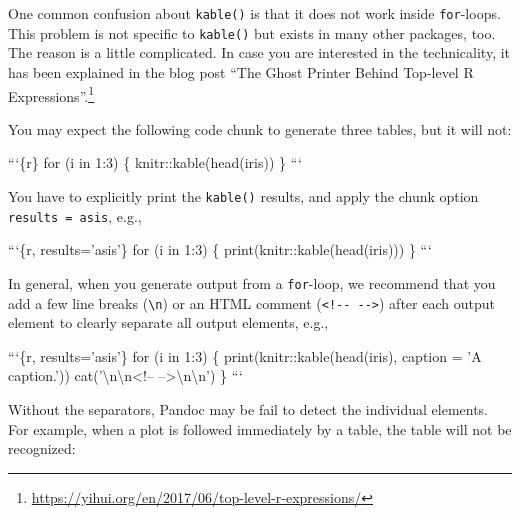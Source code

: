 \documentclass[
  11pt,
]{krantz}
\newenvironment{Shaded}{\begin{snugshade}}{\end{snugshade}}
\newcommand{\BaseNTok}[1]{\textcolor[rgb]{0.06,0.06,0.06}{#1}}
\renewcommand{\href}[2]{#2\footnote{\url{#1}}}
\begin{document}
One common confusion about \texttt{kable()} is that it does not work inside \texttt{for}-loops. This problem is not specific to \texttt{kable()} but exists in many other packages, too. The reason is a little complicated. In case you are interested in the technicality, it has been explained in the blog post \href{https://yihui.org/en/2017/06/top-level-r-expressions/}{``The Ghost Printer Behind Top-level R Expressions''.}

You may expect the following code chunk to generate three tables, but it will not:

\begin{Shaded}
\begin{Highlighting}[]
\BaseNTok{```\{r\}}
\BaseNTok{for (i in 1:3) \{}
\BaseNTok{  knitr::kable(head(iris))}
\BaseNTok{\}}
\BaseNTok{```}
\end{Highlighting}
\end{Shaded}

You have to explicitly print the \texttt{kable()} results, and apply the chunk option \texttt{results\ =\ \textquotesingle{}asis\textquotesingle{}}, e.g.,

\begin{Shaded}
\begin{Highlighting}[]
\BaseNTok{```\{r, results='asis'\}}
\BaseNTok{for (i in 1:3) \{}
\BaseNTok{  print(knitr::kable(head(iris)))}
\BaseNTok{\}}
\BaseNTok{```}
\end{Highlighting}
\end{Shaded}

In general, when you generate output from a \texttt{for}-loop, we recommend that you add a few line breaks (\texttt{\textbackslash{}n}) or an HTML comment (\texttt{\textless{}!-\/-\ -\/-\textgreater{}}) after each output element to clearly separate all output elements, e.g.,

\begin{Shaded}
\begin{Highlighting}[]
\BaseNTok{```\{r, results='asis'\}}
\BaseNTok{for (i in 1:3) \{}
\BaseNTok{  print(knitr::kable(head(iris), caption = 'A caption.'))}
\BaseNTok{  cat('\textbackslash{}n\textbackslash{}n<!-- -->\textbackslash{}n\textbackslash{}n')}
\BaseNTok{\}}
\BaseNTok{```}
\end{Highlighting}
\end{Shaded}

Without the separators, Pandoc may be fail to detect the individual elements. For example, when a plot is followed immediately by a table, the table will not be recognized:
\end{document}
